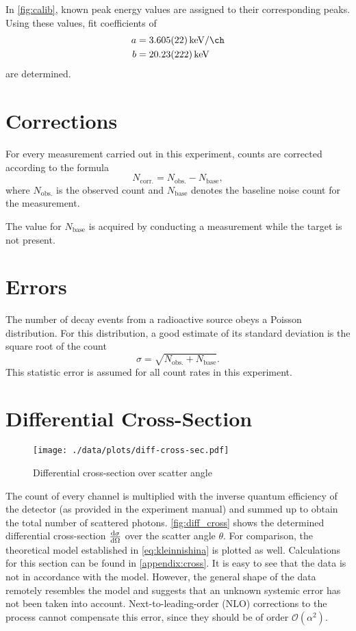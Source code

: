 In \autoref{fig:calib}, known peak energy values are assigned to their corresponding peaks.
Using these values, fit coefficients of
\begin{align*}
	a &= \SI{3.605(22)}{\kilo\eV\per\ch} \\
	b &= \SI{20.23(222)}{\kilo\eV}
\end{align*}
are determined.

\section{Corrections}
For every measurement carried out in this experiment, counts are corrected according to the formula
\begin{equation*}
	N_\text{corr.} = N_\text{obs.} - N_\text{base},
\end{equation*}
where $N_\text{obs.}$ is the observed count and $N_\text{base}$ denotes the baseline noise count for the measurement.

The value for $N_\text{base}$ is acquired by conducting a measurement while the target is not present.

\section{Errors}
The number of decay events from a radioactive source obeys a Poisson distribution.
For this distribution, a good estimate of its standard deviation is the square root of the count
\begin{equation*}
	\sigma = \sqrt{N_\text{obs.} + N_\text{base}}.
\end{equation*}
This statistic error is assumed for all count rates in this experiment.

\section{Differential Cross-Section}\label{sec:diff_cross_res}
\begin{figure}
	\centering
	\texttt{[image: ./data/plots/diff-cross-sec.pdf]}
	\caption{Differential cross-section over scatter angle}
	\label{fig:diff_cross}
\end{figure}

The count of every channel is multiplied with the inverse quantum efficiency of the detector (as provided in the experiment manual) and summed up to obtain the total number of scattered photons.
\autoref{fig:diff_cross} shows the determined differential cross-section $\frac{\text{d}\sigma}{\text{d}\Omega}$ over the scatter angle $\theta$.
For comparison, the theoretical model established in \autoref{eq:kleinnishina} is plotted as well.
Calculations for this section can be found in \autoref{appendix:cross}.
It is easy to see that the data is not in accordance with the model.
However, the general shape of the data remotely resembles the model and suggests that an unknown systemic error has not been taken into account.
Next-to-leading-order (NLO) corrections to the process cannot compensate this error, since they should be of order $\mathcal{O}(\alpha^2)$.

